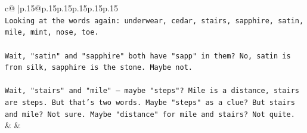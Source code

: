 \documentclass{article}
\begin{document}
{\begin{supertabular}{c@{$\;$}|p{.15\linewidth}@{}p{.15\linewidth}p{.15\linewidth}p{.15\linewidth}p{.15\linewidth}p{.15\linewidth}}
{{{\\ 
\texttt{Looking at the words again: underwear, cedar, stairs, sapphire, satin, mile, mint, nose, toe.} \\
\\ 
\texttt{Wait, "satin" and "sapphire" both have "sapp" in them? No, satin is from silk, sapphire is the stone. Maybe not.} \\
\\ 
\texttt{Wait, "stairs" and "mile" – maybe "steps"? Mile is a distance, stairs are steps. But that's two words. Maybe "steps" as a clue? But stairs and mile? Not sure. Maybe "distance" for mile and stairs? Not quite.} \\
            }
        }
    }
    & & \\ \\


\end{supertabular}}
\end{document}
